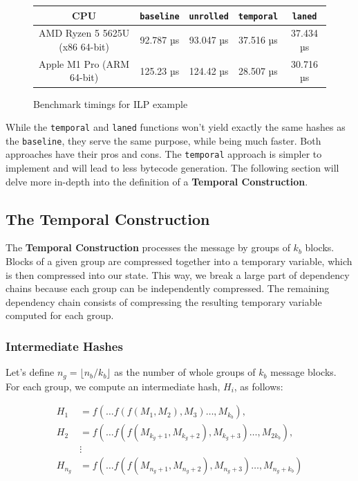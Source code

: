 \documentclass[10pt]{article}
\begin{document}
\begin{figure}[H]
\centering
\begin{tabular}{|c|c|c|c|c|}
\hline
CPU & \texttt{baseline} & \texttt{unrolled} & \texttt{temporal} & \texttt{laned} \\
\hline
AMD Ryzen 5 5625U (x86 64-bit) & 92.787 µs & 93.047 µs & 37.516 µs & 37.434 µs \\
Apple M1 Pro (ARM 64-bit) & 125.23 µs & 124.42 µs & 28.507 µs & 30.716 µs \\
\hline
\end{tabular}
\caption{Benchmark timings for ILP example}
\label{tab:your_table_label}
\end{figure}

While the \texttt{temporal} and \texttt{laned} functions won't yield exactly the same hashes as the \texttt{baseline}, they serve the same purpose, while being much faster.
Both approaches have their pros and cons. The \texttt{temporal} approach is simpler to implement and will lead to less bytecode generation.
The following section will delve more in-depth into the definition of a \textbf{Temporal Construction}.

\clearpage
\subsection{The Temporal Construction}

The \textbf{Temporal Construction} processes the message by groups of \( k_b \) blocks. Blocks of a given group are compressed together into a temporary variable, which is then compressed into our state. This way, we break a large part of dependency chains because each group can be independently compressed. The remaining dependency chain consists of compressing the resulting temporary variable computed for each group.

\subsubsection{Intermediate Hashes}

Let's define \( n_g = \lfloor {n_b}/{k_b} \rfloor \) as the number of whole groups of \( k_b \) message blocks. \\
For each group, we compute an intermediate hash, \( H_i \), as follows:

\begin{align*}
H_{1} &= f(\ldots f(f(M_1, M_2), M_3)\ldots, M_{k_b}), \\
H_{2} &= f(\ldots f(f(M_{k_g+1}, M_{k_g+2}), M_{k_g+3})\ldots, M_{2k_b}), \\
&\vdots \\
H_{n_g} &= f(\ldots f(f(M_{n_g+1}, M_{n_g+2}), M_{n_g+3})\ldots, M_{n_g+k_b})
\end{align*}
\end{document}
